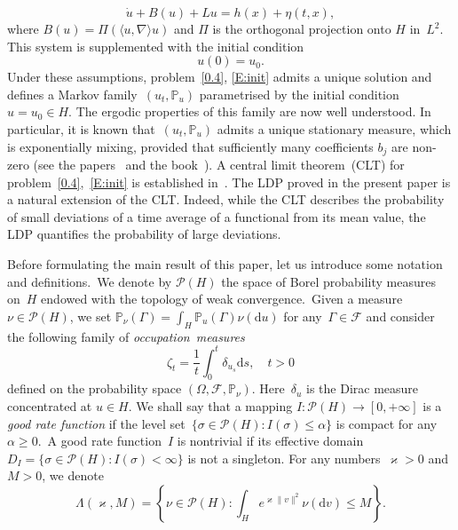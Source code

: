 \documentclass[AHL,Unicode,longabstracts]{cedram}
\newcommand{\IP}{{\mathbb P}}
\newcommand{\FF}{{\mathcal F}}
\newcommand{\PP}{{\mathcal P}}
\newcommand{\ty}{\infty}
\newcommand{\de}{\delta}
\newcommand{\dd}{\mathrm{d}}
\begin{document}
\begin{equation}\label{0.4}
\dot u+B(u)+L u =h(x)+ \eta(t,x),
\end{equation}
where $B(u)=\Pi(\langle u,\nabla \rangle u)$ and $\Pi$ is the orthogonal projection onto $H$ in~$L^2$. This system is supplemented with the initial condition
\begin{equation}\label{E:init}
u(0)=u_0.
\end{equation}
Under these assumptions, problem~\eqref{0.4}, \eqref{E:init} admits a unique solution and defines a Markov family~$(u_t,\IP_u)$ parametrised by the initial condition~$u=u_0 \in H$. The ergodic properties of this family are now well understood. In particular, it is known that~$(u_t,\IP_u)$ admits a unique stationary measure, which is exponentially mixing, provided that sufficiently many coefficients $b_j$ are non-zero (see the papers~\cite{FM-1995,KS-cmp2000,EMS-2001, KS-jmpa2002, BKL-2002,HM-2006, odasso-2008} and the book~\cite{KS-book}). A central limit theorem~(CLT) for problem~\eqref{0.4},~\eqref{E:init} is established in~\cite{kuksin-jmpa, shirikyan-ptrf}. The LDP proved in the present paper is a natural extension of the CLT. Indeed, while the CLT describes the probability of small deviations of a time average of a functional from its mean value, the LDP quantifies the probability of large deviations.


Before formulating the main result of this paper, let us introduce some notation and definitions.~We denote by $\PP(H)$ the space of Borel probability measures on~$H$ endowed with the to\-pology of weak convergence.~Given a measure~$\nu\in\PP(H)$, we set $
\IP_\nu(\Gamma)=\int_H\IP_u(\Gamma)\nu(\dd u)$ for any~$\Gamma\in \FF$ and consider the following family of \emph{occupation~measures}
\begin{equation}\label{0.5}
\zeta_t=\frac1t\int_{0}^{t}\delta_{u_s} \dd s,\quad t>0
\end{equation}
defined on the probability space $(\Omega,\FF,\IP_\nu)$. Here~$\de_u$ is the Dirac measure concentrated at $u\in H$. We shall say that a mapping $I : \PP(H) \to [0, +\ty]$ is a \emph{good rate function} if the level set~$\{\sigma\in\PP(H) : I(\sigma) \le \alpha \}$ is compact for any~$\alpha \ge0$.~A good rate function~$I$ is nontrivial if its effective domain $D_I = \{\sigma \in \PP(H) : I(\sigma) < \ty\}$ is not a singleton. For any numbers~$\varkappa>0$ and~$M>0$, we denote
\[
\Lambda(\varkappa,M)=\left\{\nu\in\PP(H):\int_He^{\varkappa\|v\|^2}\nu(\dd v)\le M \right\}.
\]
\end{document}
